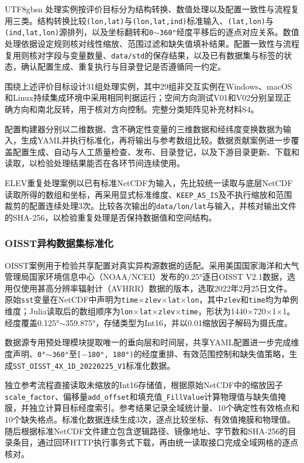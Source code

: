 \documentclass[numdoi]{chinese}
\begin{document}
\begin{CJK}{UTF8}{gbsn}
处理实例按评价目标分为结构转换、数值处理以及配置一致性与流程复用三类。结构转换比较\nolinkurl{(lon,lat)}与\nolinkurl{(lon,lat,ind)}标准输入、\nolinkurl{(lat,lon)}与\nolinkurl{(ind,lat,lon)}源排列，以及坐标翻转和\texttt{0\ensuremath{\sim}360°}经度平移后的逐点对应关系。数值处理依据设定规则核对线性缩放、范围过滤和缺失值填补结果。配置一致性与流程复用则核对字段与变量数量、\nolinkurl{data/std}的保存结果，以及已有数据集与标签的状态，确认配置生成、重复执行与目录登记是否遵循同一约定。

围绕上述评价目标设计31组处理实例，其中29组非交互实例在Windows、\allowbreak{}macOS和\allowbreak{}Linux持续集成环境中采用相同判据运行；空间方向测试V01和V02分别呈现正确方向和南北反转，用于核对方向控制。完整分类矩阵见补充材料S4。

配置构建器分别以二维数据、含不确定性变量的三维数据和经纬度变换数据为输入，生成YAML并执行标准化，再将输出与参考数组比较。数据贡献案例进一步覆盖配置生成、自动与人工质量检查、发布、目录登记，以及下游目录更新、下载和读取，以检验处理结果能否在各环节间连续使用。

ELEV重复处理案例以已有标准NetCDF为输入，先比较统一读取与底层NetCDF读取所得的数组和坐标，再采用显式标准维度、\nolinkurl{KEEP_AS_IS}及不执行缩放和范围裁剪的配置连续处理3次。比较各次输出的\nolinkurl{data/lon/lat}与输入，并核对输出文件的SHA-256，以检验重复处理是否保持数据值和空间结构。

\subsubsection{OISST异构数据集标准化}
OISST案例用于检验共享配置对真实异构源数据的适配。采用美国国家海洋和大气管理局国家环境信息中心（NOAA/NCEI）发布的0.25°逐日OISST V2.1数据，选用仅使用甚高分辨率辐射计（AVHRR）数据的版本\cite{ref7}，选取2022年2月25日文件。原始\nolinkurl{sst}变量在NetCDF中声明为\texttt{time\ensuremath{\times}zlev\ensuremath{\times}lat\ensuremath{\times}lon}，其中\nolinkurl{zlev}和\nolinkurl{time}均为单例维度；Julia读取后的数组顺序为\texttt{lon\ensuremath{\times}lat\ensuremath{\times}zlev\ensuremath{\times}time}，形状为1440\ensuremath{\times}720\ensuremath{\times}1\ensuremath{\times}1。经度覆盖0.125°\ensuremath{\sim}359.875°，存储类型为Int16，并以0.01缩放因子解码为摄氏度。

数据源专用预处理模块提取唯一的垂向层和时间层，共享YAML配置进一步完成维度声明、\texttt{0°\ensuremath{\sim}360°}至\texttt{[\ensuremath{-}180°, 180°)}的经度重排、有效范围控制和缺失值策略，生成\nolinkurl{SST_OISST_4X_1D_20220225_V1}标准化数据。

独立参考流程直接读取未缩放的Int16存储值，根据原始NetCDF中的缩放因子\nolinkurl{scale_factor}、偏移量\nolinkurl{add_offset}和填充值\nolinkurl{_FillValue}计算物理值与缺失值掩膜，并独立计算目标经度索引。参考结果记录全域统计量、10个确定性有效格点和10个缺失格点。标准化数据连续生成3次，逐点比较坐标、有效值掩膜和物理值。随后根据标准NetCDF文件建立包含逻辑路径、镜像地址、字节数和SHA-256的目录条目，通过回环HTTP执行事务式下载，再由统一读取接口完成全域网格的逐点核对。


\end{CJK}
\end{document}
